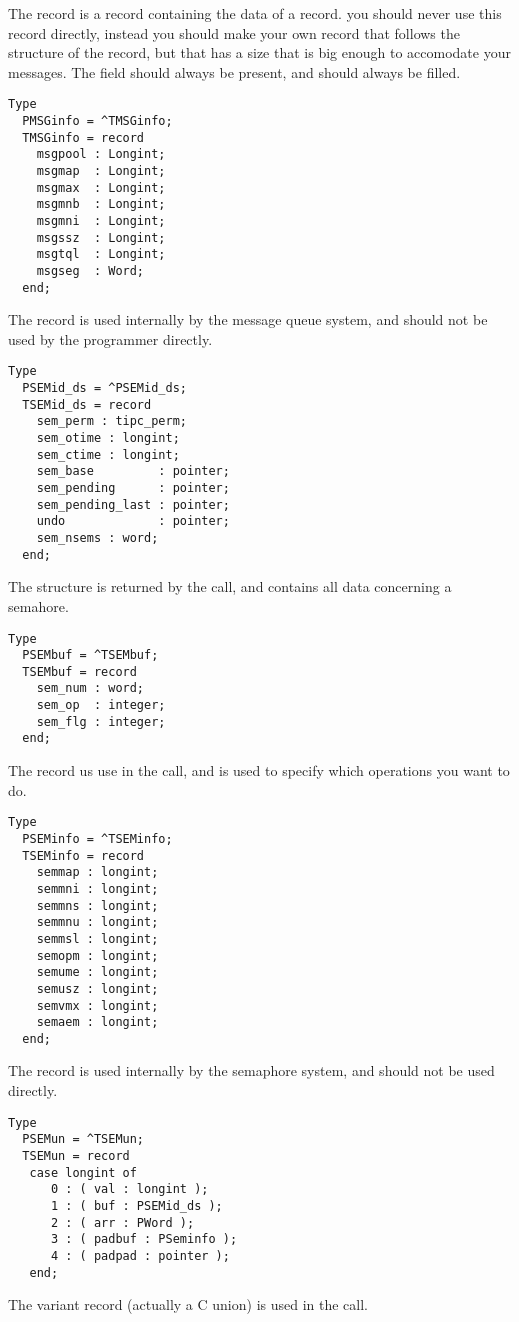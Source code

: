 The  record is a record containing the data of a record. you
should never use this record directly, instead you should make your own
record that follows the structure of the  record, but that has
a size that is big enough to accomodate your messages. The  field
should always be present, and should always be filled.
\begin{verbatim}
Type
  PMSGinfo = ^TMSGinfo;
  TMSGinfo = record
    msgpool : Longint;
    msgmap  : Longint;
    msgmax  : Longint;
    msgmnb  : Longint;
    msgmni  : Longint;
    msgssz  : Longint;
    msgtql  : Longint;
    msgseg  : Word;
  end;
\end{verbatim}
The   record is used internally by the message queue system,
and should not be used by the programmer directly.
\begin{verbatim}
Type
  PSEMid_ds = ^PSEMid_ds;
  TSEMid_ds = record
    sem_perm : tipc_perm;
    sem_otime : longint;
    sem_ctime : longint;
    sem_base         : pointer;
    sem_pending      : pointer;
    sem_pending_last : pointer;
    undo             : pointer;
    sem_nsems : word;
  end;
\end{verbatim}
The  structure is returned by the  call, and
contains all data concerning a semahore.
\begin{verbatim}
Type
  PSEMbuf = ^TSEMbuf;
  TSEMbuf = record
    sem_num : word;
    sem_op  : integer;
    sem_flg : integer;
  end;
\end{verbatim}
The  record us use in the  call, and is used to
specify which operations you want to do.
\begin{verbatim}
Type
  PSEMinfo = ^TSEMinfo;
  TSEMinfo = record
    semmap : longint;
    semmni : longint;
    semmns : longint;
    semmnu : longint;
    semmsl : longint;
    semopm : longint;
    semume : longint;
    semusz : longint;
    semvmx : longint;
    semaem : longint;
  end;
\end{verbatim}
The  record is used internally by the semaphore system, and
should not be used directly.
\begin{verbatim}
Type
  PSEMun = ^TSEMun;
  TSEMun = record
   case longint of
      0 : ( val : longint );
      1 : ( buf : PSEMid_ds );
      2 : ( arr : PWord );
      3 : ( padbuf : PSeminfo );
      4 : ( padpad : pointer );
   end;
\end{verbatim}
The  variant record (actually a C union) is used in the
 call.
 

